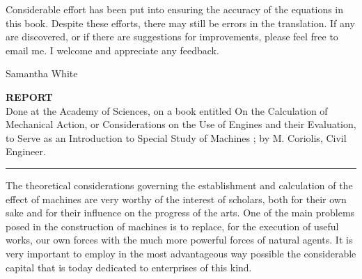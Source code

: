 \documentclass{book}
\begin{document}
Considerable effort has been put into ensuring the accuracy of the equations in this book. Despite these efforts, there may still be errors in the translation. If any are discovered, or if there are suggestions for improvements, please feel free to email me. I welcome and appreciate any feedback.

\vfill



 \hfill Samantha White\\


\vfill


\vspace{\fill}




\textbf{REPORT}
\begingroup
\centering 
\\
Done at the Academy of Sciences, on a book entitled On the Calculation of 
Mechanical Action, or Considerations on the Use of Engines and their Evaluation, to Serve as an Introduction to Special Study of Machines ; by M. Coriolis, Civil Engineer. 
\par\noindent\rule{\textwidth}{1pt}
 \endgroup
\setlength{\parindent}{20pt}
The theoretical considerations governing the establishment and calculation of the effect of machines are very worthy of the interest of scholars, both for their own sake and for their influence on the progress of the arts. One of the main problems posed in the construction of machines is to replace, for the execution of useful works, our own forces with the much more powerful forces of natural agents. It is very important to employ in the most advantageous way possible the considerable capital that is today dedicated to enterprises of this kind.
\end{document}
